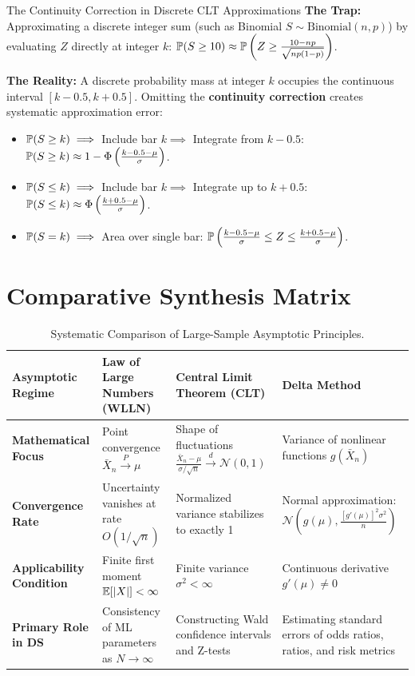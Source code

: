 \begin{trapbox}{The Continuity Correction in Discrete CLT Approximations}
\textbf{The Trap:} Approximating a discrete integer sum (such as Binomial $S \sim \text{Binomial}(n, p)$) by evaluating $Z$ directly at integer $k$: $\P(S \ge 10) \approx \P\left(Z \ge \frac{10 - np}{\sqrt{np(1-p)}}\right)$.

\textbf{The Reality:} A discrete probability mass at integer $k$ occupies the continuous interval $[k - 0.5, k + 0.5]$.
Omitting the \textbf{continuity correction} creates systematic approximation error:
\begin{itemize}
    \item $\P(S \ge k) \implies$ Include bar $k \implies$ Integrate from $k - 0.5$: $\P(S \ge k) \approx 1 - \Phi\left(\frac{k - 0.5 - \mu}{\sigma}\right)$.
    \item $\P(S \le k) \implies$ Include bar $k \implies$ Integrate up to $k + 0.5$: $\P(S \le k) \approx \Phi\left(\frac{k + 0.5 - \mu}{\sigma}\right)$.
    \item $\P(S = k) \implies$ Area over single bar: $\P\left(\frac{k - 0.5 - \mu}{\sigma} \le Z \le \frac{k + 0.5 - \mu}{\sigma}\right)$.
\end{itemize}
\end{trapbox}

\section{Comparative Synthesis Matrix}

\begin{table}[htbp]
\centering
\small
\begin{tabular}{p{3.2cm}p{3.8cm}p{3.8cm}p{3.5cm}}
\toprule
\textbf{Asymptotic Regime} & \textbf{Law of Large Numbers (WLLN)} & \textbf{Central Limit Theorem (CLT)} & \textbf{Delta Method} \\
\midrule
\textbf{Mathematical Focus} & Point convergence $\bar{X}_n \xrightarrow{P} \mu$ & Shape of fluctuations $\frac{\bar{X}_n - \mu}{\sigma/\sqrt{n}} \xrightarrow{d} \mathcal{N}(0, 1)$ & Variance of nonlinear functions $g(\bar{X}_n)$ \\
\addlinespace
\textbf{Convergence Rate} & Uncertainty vanishes at rate $O(1/\sqrt{n})$ & Normalized variance stabilizes to exactly 1 & Normal approximation: $\mathcal{N}\left(g(\mu), \frac{[g'(\mu)]^2\sigma^2}{n}\right)$ \\
\addlinespace
\textbf{Applicability Condition} & Finite first moment $\E[|X|] < \infty$ & Finite variance $\sigma^2 < \infty$ & Continuous derivative $g'(\mu) \neq 0$ \\
\addlinespace
\textbf{Primary Role in DS} & Consistency of ML parameters as $N \to \infty$ & Constructing Wald confidence intervals and Z-tests & Estimating standard errors of odds ratios, ratios, and risk metrics \\
\bottomrule
\end{tabular}
\caption{Systematic Comparison of Large-Sample Asymptotic Principles.}
\end{table}

